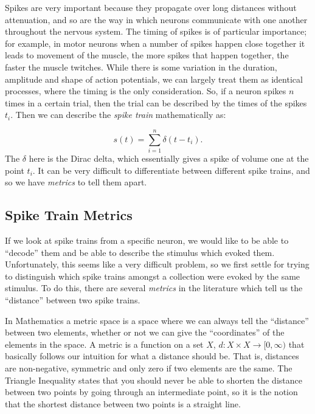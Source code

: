 Spikes are very important because they propagate over long distances without 
attenuation, and so are the way in which neurons communicate with one another 
throughout the nervous system.  The timing of spikes is of particular 
importance; for example, in motor neurons when a number of spikes happen close 
together it leads to movement of the muscle, the more spikes that happen 
together, the faster the muscle twitches.  While there is some variation in 
the duration, amplitude and shape of action potentials, we can largely treat 
them as identical processes, where the timing is the only consideration.  So, 
if a neuron spikes $n$ times in a certain trial, then the trial can be 
described by the times of the spikes $t_i$.  Then we can describe the 
{\sl spike train} mathematically as:

\begin{equation}
s(t) = \sum_{i=1}^n \delta(t-t_i).
\end{equation}
The $\delta$ here is the Dirac delta, which essentially gives a spike of volume 
one at the point $t_i$. It can be very difficult to differentiate between 
different spike trains, and so we have {\sl metrics} to tell them apart.

\subsection{Spike Train Metrics}

If we look at spike trains from a specific neuron, we would like to be able to 
``decode'' them and be able to describe the stimulus which evoked them.  
Unfortunately, this seems like a very difficult problem, so we first settle for 
trying to distinguish which spike trains amongst a collection were evoked by 
the same stimulus.  To do this, there are several {\sl metrics} in the 
literature which tell us the ``distance'' between two spike trains.  

In Mathematics a metric space is a space where we can always tell the 
``distance'' between two elements, whether or not we can give the 
``coordinates'' of the elements in the space.  A metric is a function on a set 
$X$, $d: X\times X \rightarrow [0,\infty )$ that basically follows our 
intuition for what a distance should be. That is, distances are non-negative, 
symmetric and only zero if two elements are the same. The Triangle Inequality 
states that you should never be able to shorten the distance between two points 
by going through an intermediate point, so it is the notion that the shortest 
distance between two points is a straight line.


